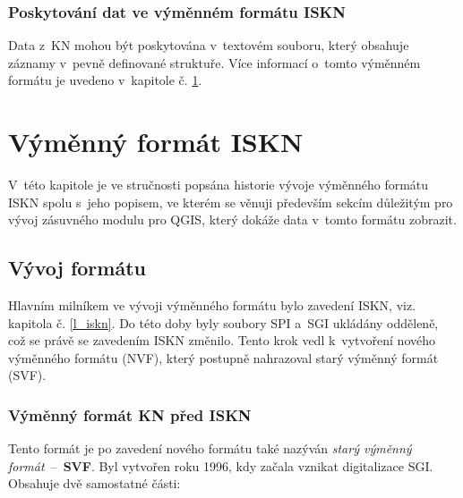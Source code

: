 \documentclass[a4paper,12pt,oneside]{book}
\begin{document}
\subsection{Poskytování dat ve výměnném formátu ISKN}

Data z~KN mohou být poskytována v~textovém souboru, který obsahuje záznamy v~pevně definované struktuře. Více informací o~tomto výměnném formátu je uvedeno v~kapitole č. \ref{l_format_vfk}.


\clearpage
\chapter{Výměnný formát ISKN}
\label{l_format_vfk}

V~této kapitole je ve stručnosti popsána historie vývoje výměnného formátu ISKN spolu s~jeho popisem, ve kterém se věnuji především sekcím důležitým pro vývoj zásuvného modulu pro QGIS, který dokáže data v~tomto formátu zobrazit.

\section{Vývoj formátu}

Hlavním milníkem ve vývoji výměnného formátu bylo zavedení ISKN, viz. kapitola č. \ref{l_iskn}. Do této doby byly soubory SPI a~SGI ukládány odděleně, což se právě se zavedením ISKN změnilo. Tento krok vedl k~vytvoření nového výměnného formátu (NVF), který postupně nahrazoval starý výměnný formát (SVF). \cite{dp_landa}

\subsection{Výměnný formát KN před ISKN}

Tento formát je po zavedení nového formátu také nazýván \textit{starý výměnný formát}~--~\textbf{SVF}. Byl vytvořen roku 1996, kdy začala vznikat digitalizace SGI. Obsahuje dvě samostatné části:
\end{document}
